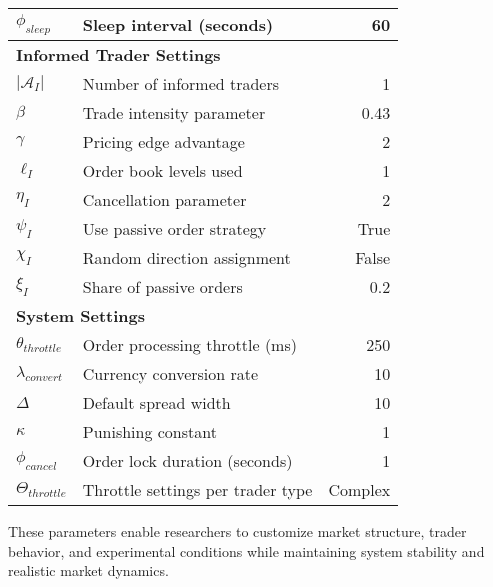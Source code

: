 \begin{table}[h]
\begin{tabular}{p{}p{}r}
$\phi_{sleep}$ & Sleep interval (seconds) & 60 \\
\midrule
\multicolumn{3}{l}{\textbf{Informed Trader Settings}} \\
$|\mathcal{A}_I|$ & Number of informed traders & 1 \\
$\beta$ & Trade intensity parameter & 0.43 \\
$\gamma$ & Pricing edge advantage & 2 \\
$\ell_I$ & Order book levels used & 1 \\
$\eta_I$ & Cancellation parameter & 2 \\
$\psi_I$ & Use passive order strategy & True \\
$\chi_I$ & Random direction assignment & False \\
$\xi_I$ & Share of passive orders & 0.2 \\
\midrule
\multicolumn{3}{l}{\textbf{System Settings}} \\
$\theta_{throttle}$ & Order processing throttle (ms) & 250 \\
$\lambda_{convert}$ & Currency conversion rate & 10 \\
$\Delta$ & Default spread width & 10 \\
$\kappa$ & Punishing constant & 1 \\
$\phi_{cancel}$ & Order lock duration (seconds) & 1 \\
$\Theta_{throttle}$ & Throttle settings per trader type & Complex \\
\bottomrule
\end{tabular}
\end{table}

These parameters enable researchers to customize market structure, trader behavior, and experimental conditions while maintaining system stability and realistic market dynamics.
